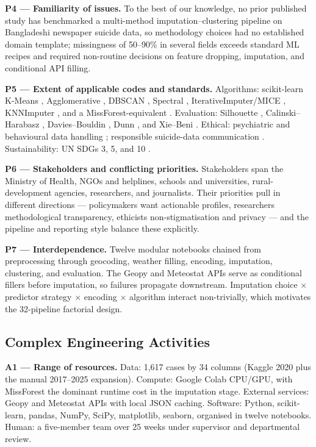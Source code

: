 \textbf{P4 --- Familiarity of issues.} To the best of our knowledge, no prior published study has benchmarked a multi-method imputation--clustering pipeline on Bangladeshi newspaper suicide data, so methodology choices had no established domain template; missingness of 50--90\% in several fields exceeds standard ML recipes and required non-routine decisions on feature dropping, imputation, and conditional API filling.

\textbf{P5 --- Extent of applicable codes and standards.} Algorithms: scikit-learn K-Means \cite{ref13}, Agglomerative \cite{ref14}, DBSCAN \cite{ref15}, Spectral \cite{ref16}, IterativeImputer/MICE \cite{ref10}, KNNImputer \cite{ref11}, and a MissForest-equivalent \cite{ref12}. Evaluation: Silhouette \cite{ref17}, Calinski--Harabasz \cite{ref18}, Davies--Bouldin \cite{ref19}, Dunn \cite{ref20}, and Xie--Beni \cite{ref21}. Ethical: psychiatric and behavioural data handling \cite{ref22}; responsible suicide-data communication \cite{ref23}. Sustainability: UN SDGs 3, 5, and 10 \cite{ref24,ref25}.

\textbf{P6 --- Stakeholders and conflicting priorities.} Stakeholders span the Ministry of Health, NGOs and helplines, schools and universities, rural-development agencies, researchers, and journalists. Their priorities pull in different directions --- policymakers want actionable profiles, researchers methodological transparency, ethicists non-stigmatisation and privacy --- and the pipeline and reporting style balance these explicitly.

\textbf{P7 --- Interdependence.} Twelve modular notebooks chained from preprocessing through geocoding, weather filling, encoding, imputation, clustering, and evaluation. The Geopy and Meteostat APIs serve as conditional fillers before imputation, so failures propagate downstream. Imputation choice $\times$ predictor strategy $\times$ encoding $\times$ algorithm interact non-trivially, which motivates the 32-pipeline factorial design.

\subsection{Complex Engineering Activities}

\textbf{A1 --- Range of resources.} Data: 1,617 cases by 34 columns (Kaggle 2020 plus the manual 2017--2025 expansion). Compute: Google Colab CPU/GPU, with MissForest the dominant runtime cost in the imputation stage. External services: Geopy and Meteostat APIs with local JSON caching. Software: Python, scikit-learn, pandas, NumPy, SciPy, matplotlib, seaborn, organised in twelve notebooks. Human: a five-member team over 25 weeks under supervisor and departmental review.

